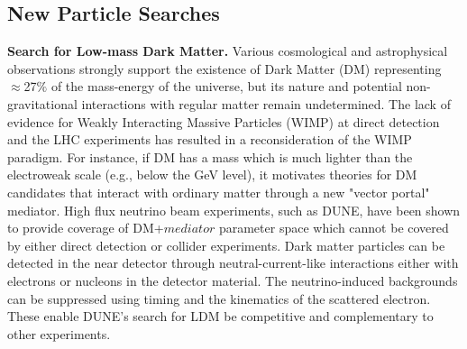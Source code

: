 \subsection{New Particle Searches}
{\bf Search for Low-mass Dark Matter.}
Various cosmological and astrophysical observations strongly support the existence of Dark Matter (DM) representing $\approx$27$\%$ of the mass-energy of the universe, but its nature and potential non-gravitational interactions with regular matter remain undetermined. 
The lack of evidence for Weakly Interacting Massive Particles (WIMP) at direct detection and the LHC experiments has resulted in a reconsideration of the WIMP paradigm. For instance, if DM has a mass which is much lighter than the electroweak scale (e.g., below the GeV level), it motivates theories for DM candidates that interact with ordinary matter through a new "vector portal" mediator.
High flux neutrino beam experiments, such as DUNE, have been shown to provide coverage of DM+$mediator$ parameter space which cannot be covered by either direct detection or collider experiments. %
Dark
matter particles can be detected in the near detector through neutral-current-like interactions 
either with electrons or nucleons in the detector material.
The neutrino-induced backgrounds can be suppressed using timing and the kinematics of the scattered electron.
These enable DUNE's search for LDM be competitive and complementary to other experiments.\\

